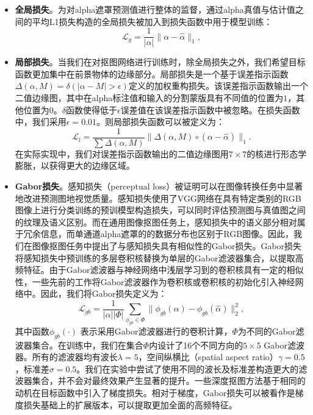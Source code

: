 \begin{itemize}
	\item \textbf{全局损失}。为对alpha遮罩预测值进行整体的监督，通过alpha真值与估计值之间的平均L1损失构造的全局损失被加入到损失函数中用于模型训练：
	\begin{equation}
	\mathcal{L}_g = \frac{1}{|\alpha|}\|\alpha-\hat{\alpha}\|_1, 
	\end{equation}

	\item \textbf{局部损失}。当我们在对抠图网络进行训练时，除全局损失之外，我们希望目标函数更加集中在前景物体的边缘部分。局部损失是一个基于误差指示函数$ \Delta(\alpha, M) = \delta(|\alpha - M|>\epsilon) $定义的加权重构损失。该误差指示函数输出一个二值边缘图，其中在alpha标注值和输入的分割蒙版具有不同值的位置为$1$，其他位置为$0$。$ \delta $函数使得低于$ \epsilon $误差值在该误差指示函数中被忽略。在损失函数中，我们采用$ \epsilon=0.01 $。则局部损失函数可以被定义为： 
	\begin{equation}
	\mathcal{L}_l = \frac{1}{\sum \Delta(\alpha, M)}\|\Delta(\alpha, M) \circ (\alpha-\hat{\alpha})\|_1.
	\end{equation}
	在实际实现中，我们对误差指示函数输出的二值边缘图用$ 7\times 7 $的核进行形态学膨胀，以获得更大的边缘区域。

	\item \textbf{Gabor损失}。感知损失（perceptual loss）\cite{johnson2016perceptual}被证明可以在图像转换任务中显著地改进预测图地视觉质量。感知损失使用了VGG网络\cite{simonyan2014very}在具有特定类别的RGB图像上进行分类训练的预训模型构造损失，可以同时评估预测图与真值图之间的纹理及语义区别。而在通用图像抠图任务上，感知损失中的语义部分相对属于冗余信息，而单通道alpha遮罩的的数据分布也区别于RGB图像。因此，我们在图像抠图任务中提出了与感知损失具有相似性的Gabor损失。Gabor损失将感知损失中预训练的多层卷积核替换为单层的Gabor滤波器集合，以提取高频特征。由于Gabor滤波器与神经网络中浅层学习到的卷积核具有一定的相似性，一些先前的工作\cite{ouyang2013joint}将Gabor滤波器作为卷积核或卷积核的初始化引入神经网络中。因此，我们将Gabor损失定义为：
	\begin{equation}
	\mathcal{L}_{gb} = \frac{1}{|\alpha||\Phi|}\sum_{\phi_{gb}\in \Phi}\|\phi_{gb}(\alpha)-\phi_{gb}(\hat{\alpha})\|_2^2,
	\end{equation}
	其中函数$ \phi_{gb}(\cdot)$ 表示采用Gabor滤波器进行的卷积计算，$ \Phi $为不同的Gabor滤波器集合。在训练中，我们在集合$ \Phi $内设计了16个不同方向的$5\times5$ Gabor滤波器。所有的滤波器均有波长$\lambda=5$，空间纵横比（spatial aspect ratio）$\gamma=0.5$，标准差$\sigma=0.5$。我们在实验中尝试了使用不同的波长及标准差构造更大的滤波器集合，并不会对最终效果产生显著的提升。一些深度抠图方法基于相同的动机在目标函数中引入了梯度损失\cite{levinshtein2018real,chen2019boundary,samplenet}。相对于梯度，Gabor损失可以被看作是梯度损失基础上的扩展版本，可以提取更加全面的高频特征。
\end{itemize}



